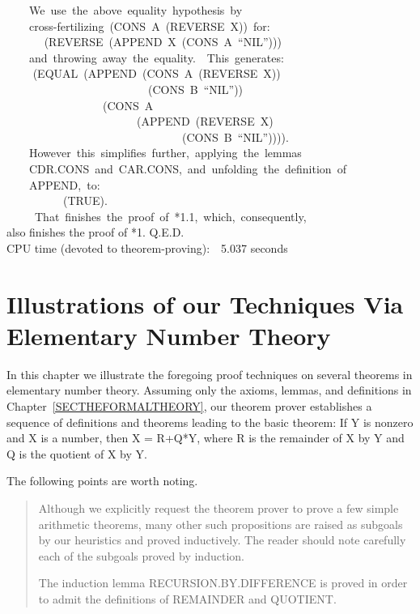 \documentclass[10pt]{book}
\newenvironment{pubasis}{\begin{flushleft}}{\end{flushleft}}
\newenvironment{pubcrown}{\begin{quote}}{\end{quote}}
\begin{document}
\begin{pubasis}
~~~~We~use~the~above~equality~hypothesis~by\\
~~~~cross-fertilizing~(CONS~A~(REVERSE~X))~for:\\
~~~~	~~(REVERSE~(APPEND~X~(CONS~A~``NIL'')))\\
~~~~and~throwing~away~the~equality.~~This~generates:\\

~~	~~(EQUAL~(APPEND~(CONS~A~(REVERSE~X))\\
~~~~~~~~~~~~~~~~~~~~~~~~~(CONS~B~``NIL''))\\
~~~~~~~~~~~~~~~~~(CONS~A\\
~~~~~~~~~~~~~~~~~~~~~~~(APPEND~(REVERSE~X)\\
~~~~~~~~~~~~~~~~~~~~~~~~~~~~~~~(CONS~B~``NIL'')))).\\

~~~~However~this~simplifies~further,~applying~the~lemmas\\
~~~~CDR.CONS~and~CAR.CONS,~and~unfolding~the~definition~of\\
~~~~APPEND,~to:\\

~~~~~~~~~~(TRUE).\\

~~~~~That~finishes~the~proof~of~*1.1,~which,~consequently,\\
also finishes the proof of *1.  Q.E.D.\\

CPU time (devoted to theorem-proving):~~5.037 seconds\\
\end{pubasis}
\chapter{Illustrations of our Techniques Via Elementary Number Theory}
\pagestyle{headings}
\label{SECELEMENTARY}
In this chapter we illustrate the foregoing proof
techniques on several theorems in elementary number theory.
Assuming only the axioms, lemmas, and definitions
in Chapter~\ref{SECTHEFORMALTHEORY}, our theorem
prover establishes a sequence of definitions and
theorems leading to the basic theorem:
If Y is nonzero and X is a number, then X = R+Q*Y,
where R is the remainder of X by Y and Q is the quotient of
X by Y.

The following points are worth noting.
\begin{pubcrown}
Although we explicitly request the theorem prover to prove a few simple
arithmetic theorems, many other such propositions
are raised as subgoals by our heuristics
and proved inductively.  The reader should note carefully
each of the subgoals proved by induction.

The induction lemma RECURSION.BY.DIFFERENCE is proved in order to admit
the definitions of REMAINDER and QUOTIENT.
\end{pubcrown}
\end{document}
